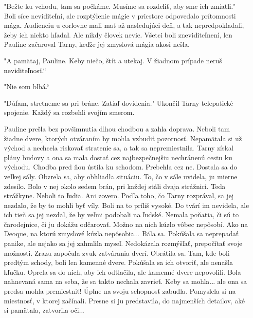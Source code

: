 \documentclass{book}
\begin{document}
"$ $Bežte ku vchodu, tam sa počkáme. Musíme sa rozdeliť, aby sme ich zmiatli."$ $ Boli síce neviditeľní, ale rozptýlenie mágie v priestore odpovedalo prítomnosti mága. Audienciu u corlovne mali mať až nasledujúci deň, a tak nepredpokladali, žeby ich niekto hľadal. Ale nikdy človek nevie. Všetci boli zneviditeľnení, len Pauline začaroval Tarny, keďže jej zmyslová mágia akosi nešla.

"$ $A pamätaj, Pauline. Keby niečo, štít a utekaj. V žiadnom prípade neruš neviditeľnosť.“

"$ $Nie som blbá.“

"$ $Dúfam, stretneme sa pri bráne. Zatiaľ dovidenia."$ $ Ukončil Tarny telepatické spojenie. Každý sa rozbehli svojím smerom.

Pauline prešla bez povšimnutia dlhou chodbou a zahla doprava. Neboli tam žiadne dvere, ktorých otváraním by mohla vzbudiť pozornosť. Nepamätala si už východ a nechcela riskovať stratenie sa, a tak sa nepremiestnila. Tarny získal plány budovy a ona sa mala dostať cez najbezpečnejšiu nechránenú cestu ku východu. Chodba pred ňou ústila ku schodom. Prebehla cez ne. Dostala sa do veľkej sály. Obzrela sa, aby obhliadla situáciu. To, čo v sále uvidela, ju mierne zdesilo. Bolo v nej okolo sedem brán, pri každej stáli dvaja strážnici. Teda strážkyne. Neboli to ľudia. Ani zovero. Podľa toho, čo Tarny rozprával, sa jej nezdalo, že by to mohli byť víly. Boli na to príliš vysoké. Do tvárí im nevidela, ale ich tieň sa jej nezdal, že by veľmi podobali na ľudské. Nemala poňatia, či sú to čarodejnice, či ju dokážu odčarovať. Možno na nich kúzlo vôbec nepôsobí. Ako na Deoque, na ktorú zmyslové kúzla nepôsobia... Bála sa. Pokúšala sa neprepadať panike, ale nejako sa jej zahmlila myseľ. Nedokázala rozmýšľať, prepočítať svoje možnosti. Zrazu započula zvuk zatvárania dverí. Obrátila sa. Tam, kde boli predtým schody, boli len kamenné dvere. Pokúšala sa ich otvoriť, ale nenašla kľučku. Oprela sa do nich, aby ich odtlačila, ale kamenné dvere nepovolili. Bola nahnevaná sama na seba, že sa takto nechala zavrieť. Keby sa mohla... ale ona sa predsa mohla premiestniť! Úplne na svoju schopnosť zabudla. Pomyslela si na miestnosť, v ktorej začínali. Presne si ju predstavila, do najmenších detailov, aké si pamätala, zatvorila oči...
\end{document}
